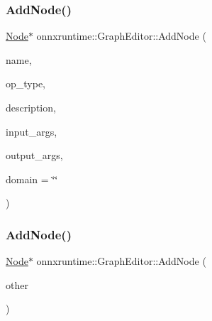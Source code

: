 \mbox{\label{classonnxruntime_1_1GraphEditor_aa2d4e6435f26f0661c9c5a8c6efd011e}} 
\subsubsection{\texorpdfstring{Add\+Node()}{AddNode()}\hspace{0.1cm}{\footnotesize\ttfamily [1/2]}}
{\footnotesize\ttfamily \mbox{\hyperlink{classonnxruntime_1_1Node}{Node}}$\ast$ onnxruntime\+::\+Graph\+Editor\+::\+Add\+Node (\begin{DoxyParamCaption}\item[{const std\+::string \&}]{name,  }\item[{const std\+::string \&}]{op\+\_\+type,  }\item[{const std\+::string \&}]{description,  }\item[{const std\+::vector$<$ \mbox{\hyperlink{classonnxruntime_1_1NodeArg}{Node\+Arg}} $\ast$$>$ \&}]{input\+\_\+args,  }\item[{const std\+::vector$<$ \mbox{\hyperlink{classonnxruntime_1_1NodeArg}{Node\+Arg}} $\ast$$>$ \&}]{output\+\_\+args,  }\item[{const std\+::string \&}]{domain = {\ttfamily \char`\"{}\char`\"{}} }\end{DoxyParamCaption})\hspace{0.3cm}{\ttfamily [inline]}}

\mbox{\label{classonnxruntime_1_1GraphEditor_ae7d6d60d1f59f87f932dc049d4c6a8d8}} 
\subsubsection{\texorpdfstring{Add\+Node()}{AddNode()}\hspace{0.1cm}{\footnotesize\ttfamily [2/2]}}
{\footnotesize\ttfamily \mbox{\hyperlink{classonnxruntime_1_1Node}{Node}}$\ast$ onnxruntime\+::\+Graph\+Editor\+::\+Add\+Node (\begin{DoxyParamCaption}\item[{const \mbox{\hyperlink{classonnxruntime_1_1Node}{Node}} \&}]{other }\end{DoxyParamCaption})\hspace{0.3cm}{\ttfamily [inline]}}

